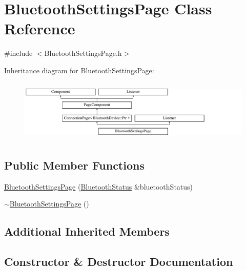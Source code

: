 \hypertarget{classBluetoothSettingsPage}{}\section{Bluetooth\+Settings\+Page Class Reference}
\label{classBluetoothSettingsPage}


{\ttfamily \#include $<$Bluetooth\+Settings\+Page.\+h$>$}

Inheritance diagram for Bluetooth\+Settings\+Page\+:\begin{figure}[H]
\begin{center}
\leavevmode
\includegraphics[height=2.974767cm]{classBluetoothSettingsPage}
\end{center}
\end{figure}
\subsection*{Public Member Functions}
\begin{DoxyCompactItemize}
\item 
\mbox{\hyperlink{classBluetoothSettingsPage_af4088b2d7f9f41bae07e71c9ad5c578b}{Bluetooth\+Settings\+Page}} (\mbox{\hyperlink{classBluetoothStatus}{Bluetooth\+Status}} \&bluetooth\+Status)
\item 
\mbox{\hyperlink{classBluetoothSettingsPage_a00a82900ebed8b3064b1c3c6882d339d}{$\sim$\+Bluetooth\+Settings\+Page}} ()
\end{DoxyCompactItemize}
\subsection*{Additional Inherited Members}


\subsection{Constructor \& Destructor Documentation}
\mbox{\label{classBluetoothSettingsPage_af4088b2d7f9f41bae07e71c9ad5c578b}} 
